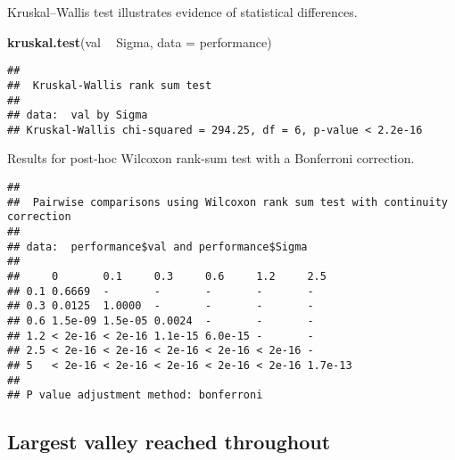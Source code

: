 \documentclass[]{book}
\newenvironment{Shaded}{\begin{snugshade}}{\end{snugshade}}
\newcommand{\DataTypeTok}[1]{\textcolor[rgb]{0.13,0.29,0.53}{#1}}
\newcommand{\KeywordTok}[1]{\textcolor[rgb]{0.13,0.29,0.53}{\textbf{#1}}}
\newcommand{\NormalTok}[1]{#1}
\newcommand{\OperatorTok}[1]{\textcolor[rgb]{0.81,0.36,0.00}{\textbf{#1}}}
\newcommand{\OtherTok}[1]{\textcolor[rgb]{0.56,0.35,0.01}{#1}}
\newcommand{\StringTok}[1]{\textcolor[rgb]{0.31,0.60,0.02}{#1}}
\begin{document}
Kruskal--Wallis test illustrates evidence of statistical differences.

\begin{Shaded}
\begin{Highlighting}[]
\KeywordTok{kruskal.test}\NormalTok{(val }\OperatorTok{~}\StringTok{ }\NormalTok{Sigma, }\DataTypeTok{data =}\NormalTok{ performance)}
\end{Highlighting}
\end{Shaded}

\begin{verbatim}
## 
##  Kruskal-Wallis rank sum test
## 
## data:  val by Sigma
## Kruskal-Wallis chi-squared = 294.25, df = 6, p-value < 2.2e-16
\end{verbatim}

Results for post-hoc Wilcoxon rank-sum test with a Bonferroni correction.

\begin{Shaded}
\end{Shaded}

\begin{verbatim}
## 
##  Pairwise comparisons using Wilcoxon rank sum test with continuity correction 
## 
## data:  performance$val and performance$Sigma 
## 
##     0       0.1     0.3     0.6     1.2     2.5    
## 0.1 0.6669  -       -       -       -       -      
## 0.3 0.0125  1.0000  -       -       -       -      
## 0.6 1.5e-09 1.5e-05 0.0024  -       -       -      
## 1.2 < 2e-16 < 2e-16 1.1e-15 6.0e-15 -       -      
## 2.5 < 2e-16 < 2e-16 < 2e-16 < 2e-16 < 2e-16 -      
## 5   < 2e-16 < 2e-16 < 2e-16 < 2e-16 < 2e-16 1.7e-13
## 
## P value adjustment method: bonferroni
\end{verbatim}

\hypertarget{largest-valley-reached-throughout-8}{%
\subsection{Largest valley reached throughout}\label{largest-valley-reached-throughout-8}}
\end{document}
